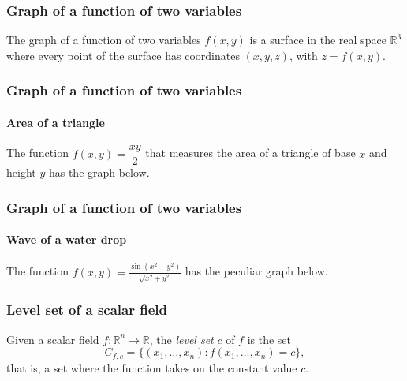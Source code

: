 \begin{frame}
\frametitle{Graph of a function of two variables}
The graph of a function of two variables $f(x,y)$ is a surface in the real space $\mathbb{R}^3$ where every point of the surface has coordinates $(x,y,z)$, with $z=f(x,y)$.
\begin{center}

\end{center}
\end{frame}


\begin{frame}
\frametitle{Graph of a function of two variables}
\framesubtitle{Area of a triangle}
The function $f(x,y)=\dfrac{xy}{2}$ that measures the area of a triangle of base $x$ and height $y$ has the graph below.
\begin{center}

\end{center}
\end{frame}


\begin{frame}
\frametitle{Graph of a function of two variables}
\framesubtitle{Wave of a water drop}
The function $\displaystyle f(x,y)=\frac{\sin(x^2+y^2)}{\sqrt{x^2+y^2}}$ has the peculiar graph below.
\begin{center}

\end{center}
\end{frame}


\begin{frame}
\frametitle{Level set of a scalar field}
\begin{definition}
Given a scalar field $f:\mathbb{R}^n\rightarrow \mathbb{R}$, the \emph{level set} $c$ of $f$ is the set
\[
C_{f,c}=\{(x_1,\ldots,x_n): f(x_1,\ldots,x_n)=c\},
\]
that is, a set where the function takes on the constant value $c$.
\end{definition}
\end{frame}


